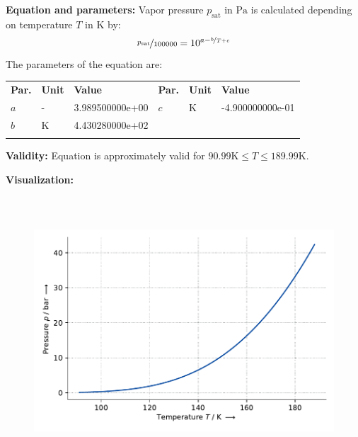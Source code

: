 \textbf{Equation and parameters:}
\newline
%
Vapor pressure $p_\mathrm{sat}$ in $\si{\pascal}$ is calculated depending on temperature $T$ in $\si{\kelvin}$ by:
%
\begin{equation*}
\nicefrac{p_\mathrm{sat}}{100000} = 10^{a - \nicefrac{b}{T + c}}
\end{equation*}
%
The parameters of the equation are:
%
\begin{longtable}[l]{lll|lll}
\toprule
\addlinespace
\textbf{Par.} & \textbf{Unit} & \textbf{Value} &	\textbf{Par.} & \textbf{Unit} & \textbf{Value} \\
\addlinespace
\midrule
\endhead

\bottomrule
\endfoot
\bottomrule
\endlastfoot
\addlinespace

$a$ & - & 3.989500000e+00 & $c$ & $\si{\kelvin}$  & -4.900000000e-01 \\
$b$ & $\si{\kelvin}$ & 4.430280000e+02 & & & \\

\addlinespace\end{longtable}

\textbf{Validity:}
\newline
Equation is approximately valid for $90.99 \si{\kelvin} \leq T \leq 189.99 \si{\kelvin}$.
\newline

\textbf{Visualization:}
%
\begin{figure}[!htp]
{\noindent\includegraphics[height=10cm, keepaspectratio]{figs/ref/ref_Methane_VaporPressure_Antoine_1.pdf}}
\end{figure}
%

